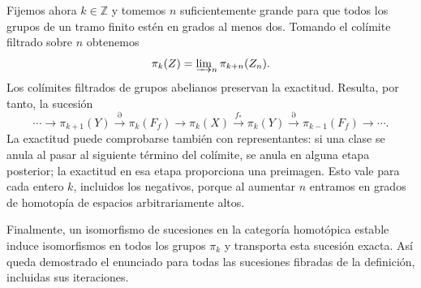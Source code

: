 \begin{sol}
Fijemos ahora $k\in\mathbb Z$ y tomemos $n$ suficientemente grande para que todos los grupos de un tramo finito estén en grados al menos dos. Tomando el colímite filtrado sobre $n$ obtenemos
\[
\pi_k(Z)=\varinjlim\nolimits_n\pi_{k+n}(Z_n).
\]
Los colímites filtrados de grupos abelianos preservan la exactitud. Resulta, por tanto, la sucesión
\[
\cdots\longrightarrow\pi_{k+1}(Y)
\xrightarrow{\partial}\pi_k(F_f)
\longrightarrow\pi_k(X)
\xrightarrow{f_*}\pi_k(Y)
\xrightarrow{\partial}\pi_{k-1}(F_f)\longrightarrow\cdots.
\]
La exactitud puede comprobarse también con representantes: si una clase se anula al pasar al siguiente término del colímite, se anula en alguna etapa posterior; la exactitud en esa etapa proporciona una preimagen. Esto vale para cada entero $k$, incluidos los negativos, porque al aumentar $n$ entramos en grados de homotopía de espacios arbitrariamente altos.

Finalmente, un isomorfismo de sucesiones en la categoría homotópica estable induce isomorfismos en todos los grupos $\pi_k$ y transporta esta sucesión exacta. Así queda demostrado el enunciado para todas las sucesiones fibradas de la definición, incluidas sus iteraciones.
\end{sol}

